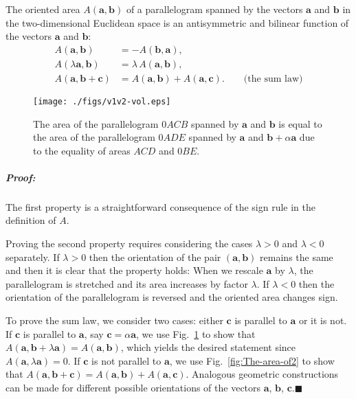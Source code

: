 The oriented area $A(\mathbf{a},\mathbf{b})$ of a parallelogram spanned
by the vectors $\mathbf{a}$ and $\mathbf{b}$ in the two-dimen\-sion\-al
Euclidean space is an antisymmetric and bilinear function of the vectors
$\mathbf{a}$ and $\mathbf{b}$:\begin{align*}
A(\mathbf{a},\mathbf{b}) & =-A(\mathbf{b},\mathbf{a}),\\
A(\lambda\mathbf{a},\mathbf{b}) & =\lambda\, A(\mathbf{a},\mathbf{b}),\\
A(\mathbf{a},\mathbf{b}+\mathbf{c}) & =A(\mathbf{a},\mathbf{b})+A(\mathbf{a},\mathbf{c}).\qquad\text{(the sum law)}\end{align*}


%
\begin{figure}
\begin{centering}
       \texttt{[image: ./figs/v1v2-vol.eps]}
\par\end{centering}

\caption{The area of the parallelogram $0ACB$ spanned by $\mathbf{a}$ and
$\mathbf{b}$ is equal to the area of the parallelogram $0ADE$ spanned
by $\mathbf{a}$ and $\mathbf{b}+\alpha\mathbf{a}$ due to the equality
of areas $ACD$ and $0BE$.\label{fig:The-area-of1}}

\end{figure}



\subparagraph{Proof:}

The first property is a straightforward consequence of the sign rule
in the definition of $A$.

Proving the second property requires considering the cases $\lambda>0$
and $\lambda<0$ separately. If $\lambda>0$ then the orientation
of the pair $\left(\mathbf{a},\mathbf{b}\right)$ remains the same
and then it is clear that the property holds: When we rescale $\mathbf{a}$
by $\lambda$, the parallelogram is stretched and its area increases
by factor $\lambda$. If $\lambda<0$ then the orientation of the
parallelogram is reversed and the oriented area changes sign.

To prove the sum law, we consider  two cases: either $\mathbf{c}$
is parallel to $\mathbf{a}$ or it is not. If $\mathbf{c}$ is parallel
to $\mathbf{a}$, say $\mathbf{c}=\alpha\mathbf{a}$, we use Fig.~\ref{fig:The-area-of1}
to show that $A(\mathbf{a},\mathbf{b}+\lambda\mathbf{a})=A(\mathbf{a},\mathbf{b})$,
which yields the desired statement since $A(\mathbf{a},\lambda\mathbf{a})=0$.
If $\mathbf{c}$ is not parallel to $\mathbf{a}$, we use Fig.~\ref{fig:The-area-of2}
to show that $A(\mathbf{a},\mathbf{b}+\mathbf{c})=A(\mathbf{a},\mathbf{b})+A(\mathbf{a},\mathbf{c})$.
Analogous geometric constructions can be made for different possible
orientations of the vectors $\mathbf{a}$, $\mathbf{b}$, $\mathbf{c}$.\hfill{}$\blacksquare$


